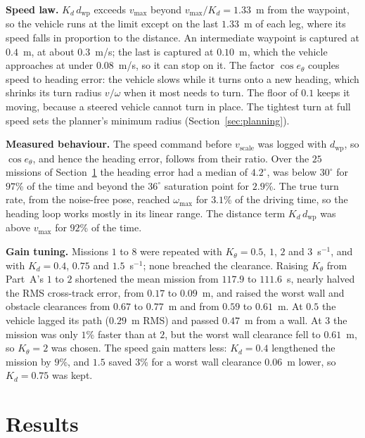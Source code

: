 \textbf{Speed law.} $K_{d}\,d_{\text{wp}}$ exceeds $v_{\max}$ beyond
$v_{\max}/K_{d} = 1.33$~m from the waypoint, so the vehicle runs at the
limit except on the last $1.33$~m of each leg, where its speed falls in
proportion to the distance. An intermediate waypoint is captured at
$0.4$~m, at about $0.3$~m/s; the last is captured at $0.10$~m, which the
vehicle approaches at under $0.08$~m/s, so it can stop on it. The factor
$\cos e_{\theta}$ couples speed to heading error: the vehicle slows while
it turns onto a new heading, which shrinks its turn radius $v/\omega$
when it most needs to turn. The floor of $0.1$ keeps it moving, because
a steered vehicle cannot turn in place. The tightest turn at full
speed sets the planner's minimum radius (Section~\ref{sec:planning}).

\textbf{Measured behaviour.} The speed command before $v_{\text{scale}}$
was logged with $d_{\text{wp}}$, so $\cos e_{\theta}$, and hence the
heading error, follows from their ratio. Over the $25$ missions of
Section~\ref{sec:results} the heading error had a median of
$4.2^{\circ}$, was below $30^{\circ}$ for $97$\% of the time and beyond
the $36^{\circ}$ saturation point for $2.9$\%. The true turn rate,
from the noise-free pose, reached $\omega_{\max}$ for $3.1$\% of the
driving time, so the heading loop works mostly in its linear range. The
distance term $K_{d}\,d_{\text{wp}}$ was above $v_{\max}$ for $92$\% of the time.

\textbf{Gain tuning.} Missions $1$ to $8$ were repeated with
$K_{\theta} = 0.5$, $1$, $2$ and $3$~s$^{-1}$, and with $K_{d} = 0.4$,
$0.75$ and $1.5$~s$^{-1}$; none breached the clearance. Raising
$K_{\theta}$ from Part~A's $1$ to $2$ shortened the mean mission from
$117.9$ to $111.6$~s, nearly halved the RMS cross-track error, from
$0.17$ to $0.09$~m, and raised the worst wall and obstacle clearances
from $0.67$ to $0.77$~m and from $0.59$ to $0.61$~m. At $0.5$ the
vehicle lagged its path ($0.29$~m RMS) and passed $0.47$~m from a wall.
At $3$ the mission was only $1$\% faster than at $2$, but the worst wall
clearance fell to $0.61$~m, so $K_{\theta} = 2$ was chosen. The speed
gain matters less: $K_{d} = 0.4$ lengthened the mission by $9$\%, and
$1.5$ saved $3$\% for a worst wall clearance $0.06$~m lower, so
$K_{d} = 0.75$ was kept.

\section{Results}
\label{sec:results}


